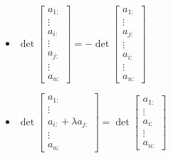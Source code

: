 \documentclass[12pt, openany]{report}
\theoremstyle{definition}
\begin{document}
\begin{minipage}{.5\textwidth}
\begin{itemize}
    \item \(\det\begin{bmatrix}
        a_{1:} \\ \vdots \\ a_{i:} \\ \vdots \\ a_{j:} \\ \vdots \\ a_{n:}
    \end{bmatrix} = - \det\begin{bmatrix}
        a_{1:} \\ \vdots \\ a_{j:} \\ \vdots \\ a_{i:} \\ \vdots \\ a_{n:}
    \end{bmatrix}\)
\end{itemize}
\end{minipage}
\begin{minipage}{.5\textwidth}
\begin{itemize}
    \item \(\det\begin{bmatrix}
        a_{1:} \\ \vdots \\ a_{i:} +\lambda a_{j:}\\ \vdots \\ a_{n:}
    \end{bmatrix} = \det\begin{bmatrix}
        a_{1:} \\ \vdots \\ a_{i:} \\ \vdots \\ a_{n:}
    \end{bmatrix}\)
\end{itemize}
\end{minipage}
\end{document}

